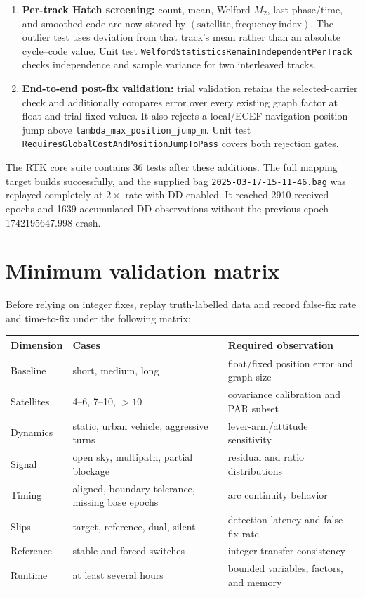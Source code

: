\documentclass[11pt,a4paper]{article}
\newcommand{\code}[1]{\texttt{#1}}
\begin{document}
\begin{enumerate}
  \item \textbf{Per-track Hatch screening:} count, mean, Welford $M_2$, last
  phase/time, and smoothed code are now stored by $(\mathrm{satellite},
  \mathrm{frequency\ index})$.  The outlier test uses deviation from that
  track's mean rather than an absolute cycle--code value.  Unit test
  \code{WelfordStatisticsRemainIndependentPerTrack} checks independence and
  sample variance for two interleaved tracks.

  \item \textbf{End-to-end post-fix validation:} trial validation retains the
  selected-carrier check and additionally compares error over every existing
  graph factor at float and trial-fixed values.  It also rejects a local/ECEF
  navigation-position jump above
  \code{lambda\_max\_position\_jump\_m}.  Unit test
  \code{RequiresGlobalCostAndPositionJumpToPass} covers both rejection gates.
\end{enumerate}

The RTK core suite contains 36 tests after these additions.  The full mapping
target builds successfully, and the supplied bag
\code{2025-03-17-15-11-46.bag} was replayed completely at $2\times$ rate with
DD enabled.  It reached 2910 received epochs and 1639 accumulated DD
observations without the previous epoch-1742195647.998 crash.

\section{Minimum validation matrix}

Before relying on integer fixes, replay truth-labelled data and record false-fix
rate and time-to-fix under the following matrix:
\begin{center}
\begin{tabular}{lll}
\toprule
Dimension & Cases & Required observation \\
\midrule
Baseline & short, medium, long & float/fixed position error and graph size \\
Satellites & 4--6, 7--10, $>10$ & covariance calibration and PAR subset \\
Dynamics & static, urban vehicle, aggressive turns & lever-arm/attitude sensitivity \\
Signal & open sky, multipath, partial blockage & residual and ratio distributions \\
Timing & aligned, boundary tolerance, missing base epochs & arc continuity behavior \\
Slips & target, reference, dual, silent & detection latency and false-fix rate \\
Reference & stable and forced switches & integer-transfer consistency \\
Runtime & at least several hours & bounded variables, factors, and memory \\
\bottomrule
\end{tabular}
\end{center}
\end{document}
